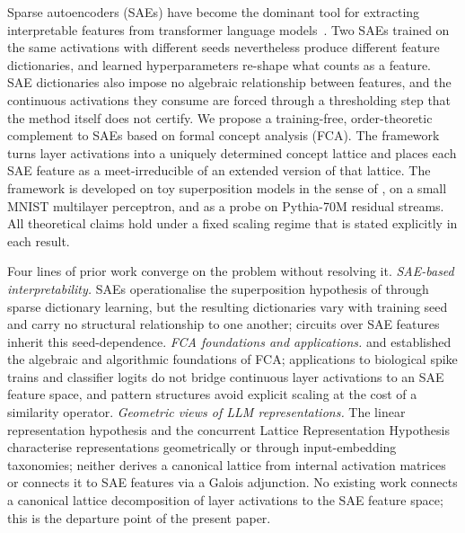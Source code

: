\documentclass[a4paper,fleqn]{cas-dc}
\begin{document}
Sparse autoencoders (SAEs) have become the dominant tool for extracting interpretable features from transformer language models~\citep{bricken2023monosemanticity,cunningham2024sparse,templeton2024scaling,rajamanoharan2024improving,gao2024scaling,lieberum2024gemma}.
Two SAEs trained on the same activations with different seeds nevertheless produce different feature dictionaries, and learned hyperparameters re-shape what counts as a feature.
SAE dictionaries also impose no algebraic relationship between features, and the continuous activations they consume are forced through a thresholding step that the method itself does not certify.
We propose a training-free, order-theoretic complement to SAEs based on formal concept analysis (FCA).
The framework turns layer activations into a uniquely determined concept lattice and places each SAE feature as a meet-irreducible of an extended version of that lattice.
The framework is developed on toy superposition models in the sense of \citet{elhage2022superposition}, on a small MNIST multilayer perceptron, and as a probe on Pythia-70M residual streams.
All theoretical claims hold under a fixed scaling regime that is stated explicitly in each result.

Four lines of prior work converge on the problem without resolving it.
\textit{SAE-based interpretability.}
SAEs \citep{bricken2023monosemanticity,cunningham2024sparse,templeton2024scaling} operationalise the superposition hypothesis of \citet{elhage2022superposition} through sparse dictionary learning, but the resulting dictionaries vary with training seed and carry no structural relationship to one another; circuits over SAE features \citep{marks2024sparse} inherit this seed-dependence.
\textit{FCA foundations and applications.}
\citet{wille1982restructuring} and \citet{ganterwille1999} established the algebraic and algorithmic foundations of FCA; applications to biological spike trains \citep{endres2008exploring} and classifier logits \citep{hanika2022conceptual} do not bridge continuous layer activations to an SAE feature space, and pattern structures \citep{ganterkuznetsov2001pattern,kaytoue2011mining} avoid explicit scaling at the cost of a similarity operator.
\textit{Geometric views of LLM representations.}
The linear representation hypothesis \citep{park2023linear,park2024geometry} and the concurrent Lattice Representation Hypothesis \citep{xiong2026lattice} characterise representations geometrically or through input-embedding taxonomies; neither derives a canonical lattice from internal activation matrices or connects it to SAE features via a Galois adjunction.
No existing work connects a canonical lattice decomposition of layer activations to the SAE feature space; this is the departure point of the present paper.
\end{document}
